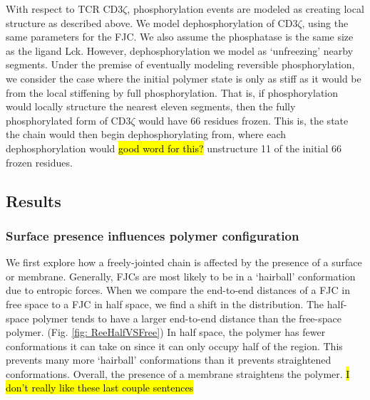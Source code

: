 \documentclass[../../AdvancementSummary.tex]{subfiles}
\begin{document}
With respect to TCR CD3$\zeta$, phosphorylation events are modeled as creating local structure as described above. We model dephosphorylation of CD3$\zeta$, using the same parameters for the FJC. We also assume the phosphatase is the same size as the ligand Lck. However, dephosphorylation we model as `unfreezing' nearby segments. Under the premise of eventually modeling reversible phosphorylation, we consider the case where the initial polymer state is only as stiff as it would be from the local stiffening by full phosphorylation.  That is, if phosphorylation would locally structure the nearest eleven segments, then the fully phosphorylated form of CD3$\zeta$ would have 66 residues frozen. This is, the state the chain would then begin dephosphorylating from, where each dephosphorylation would \hl{good word for this?} unstructure 11 of the initial 66 frozen residues. 


\subsection{Results}

\subsubsection{Surface presence influences polymer configuration}
We first explore how a freely-jointed chain is affected by the presence of a surface or membrane. Generally, FJCs are most likely to be in a `hairball' conformation due to entropic forces. When we compare the end-to-end distances of a FJC in free space to a FJC in half space, we find a shift in the distribution. The half-space polymer tends to have a larger end-to-end distance than the free-space polymer. (Fig. \ref{fig: ReeHalfVSFree}) In half space, the polymer has fewer conformations it can take on since it can only occupy half of the region. This prevents many more `hairball' conformations than it prevents straightened conformations.  Overall, the presence of a membrane straightens the polymer. \hl{I don't really like these last couple sentences}
\end{document}
